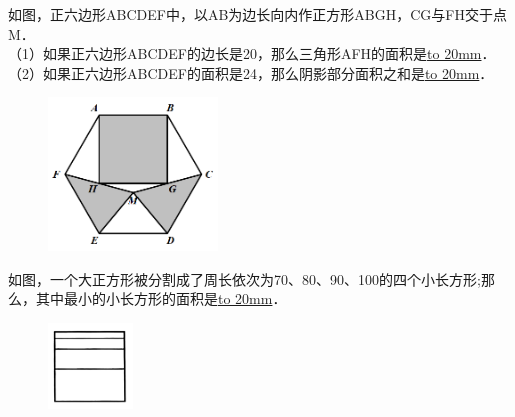 \item {
    如图，正六边形ABCDEF中，以AB为边长向内作正方形ABGH，CG与FH交于点M．\\
    （1）如果正六边形ABCDEF的边长是20，那么三角形AFH的面积是\underline{\hbox to 20mm{}}．\\
    （2）如果正六边形ABCDEF的面积是24，那么阴影部分面积之和是\underline{\hbox to 20mm{}}．
    \begin{figure}[H] 
        \centering
        \includegraphics[width=0.4\textwidth]{./pics/Chapter_3/3.png}
    \end{figure}
    \vspace{1cm}
}
\item {
    如图，一个大正方形被分割成了周长依次为70、80、90、100的四个小长方形;那么，其中最小的小长方形的面积是\underline{\hbox to 20mm{}}．
    \begin{figure}[H] 
        \centering
        \includegraphics[width=0.2\textwidth]{./pics/Chapter_3/4.png}
    \end{figure}
    \vspace{1cm}
}

